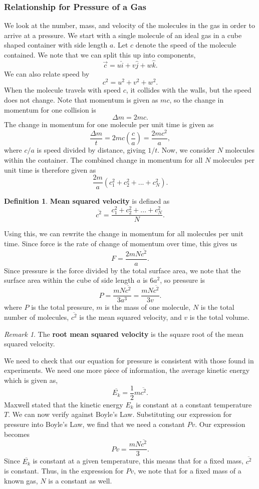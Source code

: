 \documentclass[11pt]{article}
\theoremstyle{plain} %
\theoremstyle{definition}
\newtheorem*{definition}{Definition} %
\theoremstyle{example}
\theoremstyle{remark}
\newtheorem*{remark}{Remark}
\begin{document}
\subsubsection{Relationship for Pressure of a Gas}
	We look at the number, mass, and velocity of the molecules in the gas in order to arrive at a pressure. We start with a single molecule of an ideal gas in a cube shaped container with side length $a$. Let $c$ denote the speed of the molecule contained. We note that we can split this up into components,
	$$\vec{c} = u\hat{i} + v\hat{j} + w\hat{k}.$$We can also relate speed by 
	$$c^2 = u^2+v^2+w^2.$$
	When the molecule travels with speed $c$, it collides with the walls, but the speed does not change. Note that momentum is given as $mc$, so the change in momentum for one collision is 
	$$\Delta m = 2mc.$$
The change in momentum for one molecule per unit time is given as 
$$\frac{\Delta m}{t} = 2mc\left(\frac{c}{a}\right)= \frac{2mc^2}{a},$$
where $c/a$ is speed divided by distance, giving $1/t$. Now, we consider $N$ molecules within the container. The combined change in momentum for all $N$ molecules per unit time is therefore given as 
$$\frac{2m}{a}\left(c_1^2 + c_2^2 + ...+c_N^2\right).$$	
	
\begin{definition}
\textbf{Mean squared velocity} is defined as 
$$\overline{c^2} = \frac{c_1^2 + c_2^2 + ...+c_N^2}{N}.$$
\end{definition}
	
Using this, we can rewrite the change in momentum for all molecules per unit time. Since force is the rate of change of momentum over time, this gives us
$$F = \frac{2mN\overline{c^2}}{a}.$$
Since pressure is the force divided by the total surface area, we note that the surface area within the cube of side length $a$ is $6a^2$, so pressure is 
$$P = \frac{mN\overline{c^2}}{3a^3} = \frac{mN\overline{c^2}}{3v}. $$
where $P$ is the total pressure, $m$ is the mass of one molecule, $N$ is the total number of molecules, $\overline{c^2}$ is the mean squared velocity, and $v$ is the total volume.

\begin{remark}
The \textbf{root mean squared velocity} is the square root of the mean squared velocity.
\end{remark}
	
We need to check that our equation for pressure is consistent with those found in experiments. We need one more piece of information, the average kinetic energy which is given as,
$$\overline{E_k} = \frac{1}{2}m\overline{c^2}.$$
Maxwell stated that the kinetic energy $E_k$ is constant at a constant temperature $T$. We can now verify against Boyle's Law. Substituting our expression for pressure into Boyle's Law, we find that we need a constant $Pv$. Our expression becomes $$Pv = \frac{mN\overline{c^2}}{3}.$$ Since $\overline{E_k}$ is constant at a given temperature, this means that for a fixed mass, $\overline{c^2}$ is constant. Thus, in the expression for $Pv$, we note that for a fixed mass of a known gas, $N$ is a constant as well. 
	
\end{document}
